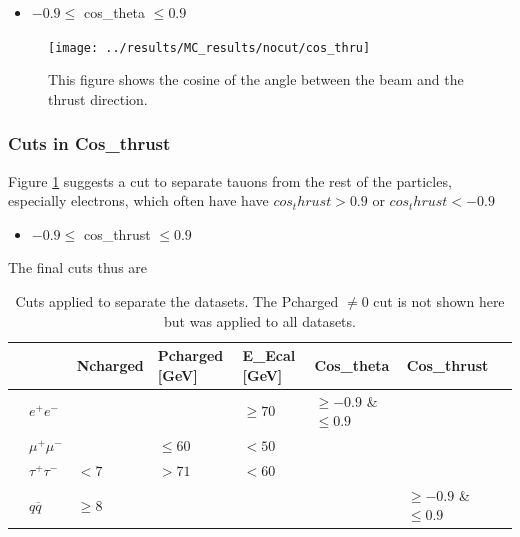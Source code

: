 \begin{itemize}
	\item{ $-0.9\le$ cos\_theta $\le0.9$}
\end{itemize}

\newpage
\begin{figure}[H]
\centering
\texttt{[image: ../results/MC\_results/nocut/cos\_thru]}
\caption[Cos\_thru in simulation data]{This figure shows the cosine of the angle between the beam and the thrust direction.}
\label{fig:cos_thru}
\end{figure}

\subsubsection{Cuts in Cos\_thrust}
Figure \ref{fig:cos_thru} suggests a cut to separate tauons from the rest of the particles, especially electrons, which often have have $cos_thrust>0.9$ or $cos_thrust<-0.9$

\begin{itemize}
	\item{ $-0.9\le$ cos\_thrust $\le0.9$}
\end{itemize}

The final cuts thus are
\begin{table}[H]\centering
	\begin{tabular}{@{}llllllll@{}}
		\toprule
		&			&Ncharged	&Pcharged [GeV]	&E\_Ecal [GeV] &Cos\_theta				&Cos\_thrust\\ 
		\midrule
		&$e^+e^-$	&			&				&$\ge70$		&$\ge-0.9$ \& $\le0.9$	&\\
		&$\mu^+\mu^-$		&			&$\le60$		&$<50$			&						&\\
		&$\tau^+\tau^-$		&$<7$		&$>71$			&$<60$			&						&\\
		&$q\overline{q}$		&$\ge8$		&				&				&						&$\ge-0.9$ \& $\le0.9$	\\
		\bottomrule
	\end{tabular}
	\caption[Table of cuts]{Cuts applied to separate the datasets. The Pcharged $\ne0$ cut is not shown here but was applied to all datasets.}
\end{table}

